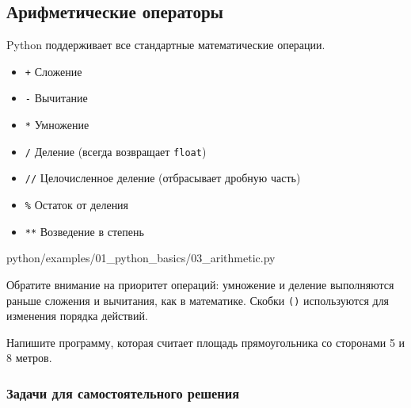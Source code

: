 \subsection{Арифметические операторы}

Python поддерживает все стандартные математические операции.

\begin{itemize}
    \item \texttt{+} Сложение
    \item \texttt{-} Вычитание
    \item \texttt{*} Умножение
    \item \texttt{/} Деление (всегда возвращает \texttt{float})
    \item \texttt{//} Целочисленное деление (отбрасывает дробную часть)
    \item \texttt{\%} Остаток от деления
    \item \texttt{**} Возведение в степень
\end{itemize}

\begin{codefile}[python]{python/examples/01_python_basics/03_arithmetic.py}
\end{codefile}

Обратите внимание на приоритет операций: умножение и деление выполняются раньше сложения и вычитания, как в математике. Скобки \texttt{()} используются для изменения порядка действий.

\begin{taskbox}[Калькулятор]
Напишите программу, которая считает площадь прямоугольника со сторонами 5 и 8 метров.
\end{taskbox}

\subsubsection*{Задачи для самостоятельного решения}

